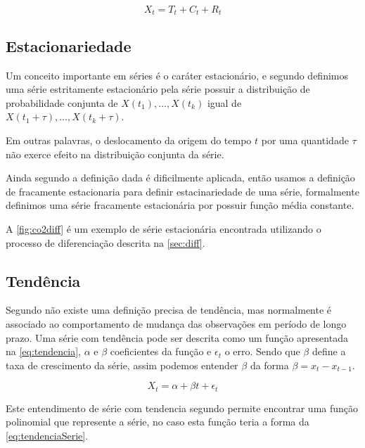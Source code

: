 \documentclass[
	12pt,
	oneside,
	a4paper,
	english,
	brazil
]{abntex2}
\begin{document}
\begin{equation}
	\label{eq:timeseries}
	X_t = T_t + C_t + R_t
\end{equation}

\subsection{Estacionariedade}

Um conceito importante em séries é o caráter estacionário, e segundo 
 definimos uma série estritamente estacionário pela série 
possuir a distribuição de probabilidade conjunta de $X(t_1), \ldots, X(t_k)$ 
igual de $X(t_1 + \tau), \ldots, X(t_k + \tau)$.

Em outras palavras, o deslocamento da origem do tempo $t$ por uma quantidade 
$\tau$ não exerce efeito na distribuição conjunta da série.

Ainda segundo  a definição dada é dificilmente aplicada, 
então usamos a definição de fracamente estacionaria para definir estacinariedade 
de uma série, formalmente definimos uma série fracamente estacionária por 
possuir função média constante.

A \autoref{fig:co2diff} é um exemplo de série estacionária encontrada utilizando 
o processo de diferenciação descrita na \autoref{sec:diff}.

\subsection{Tendência}

Segundo  não existe uma definição precisa de tendência, mas 
normalmente é associado ao comportamento de mudança das observações em período 
de longo prazo. Uma série com tendência pode ser descrita como um função 
apresentada na \autoref{eq:tendencia}, $\alpha$ e $\beta{}$ coeficientes da 
função e $\epsilon{}_t$ o erro. Sendo que $\beta{}$ define a taxa de crescimento 
da série, assim podemos entender $\beta$ da forma $\beta = x_t - x_{t-1}$.

\begin{equation}
	\label{eq:tendencia}
	X_t = \alpha + \beta{}t + \epsilon{}_t
\end{equation}

Este entendimento de série com tendencia segundo  permite 
encontrar uma função polinomial que represente a série, no caso esta função 
teria a forma da \autoref{eq:tendenciaSerie}.
\end{document}
